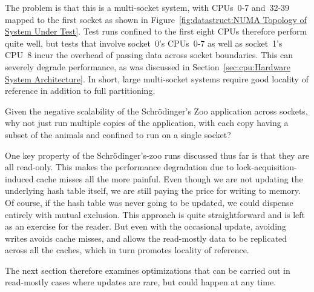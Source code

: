 The problem is that this is a multi-socket system, with CPUs~0-7
and~32-39 mapped to the first socket as shown in
Figure~\ref{fig:datastruct:NUMA Topology of System Under Test}.
Test runs confined to the first eight CPUs therefore perform quite
well, but tests that involve socket~0's CPUs~0-7 as well as
socket~1's CPU~8 incur the overhead of passing data across
socket boundaries.
This can severely degrade performance, as was discussed in
Section~\ref{sec:cpu:Hardware System Architecture}.
In short, large multi-socket systems require good locality of reference
in addition to full partitioning.

\QuickQuiz{}
	Given the negative scalability of the Schr\"odinger's
	Zoo application across sockets, why not just run multiple
	copies of the application, with each copy having a subset
	of the animals and confined to run on a single socket?
 \QuickQuizEnd

One key property of the Schr\"odinger's-zoo runs discussed thus far is that
they are all read-only.
This makes the performance degradation due to lock-acquisition-induced
cache misses all the more painful.
Even though we are not updating the underlying hash table itself, we are
still paying the price for writing to memory.
Of course, if the hash table was never going to be updated, we could dispense
entirely with mutual exclusion.
This approach is quite straightforward and is left as an exercise for the
reader.
But even with the occasional update, avoiding writes avoids cache
misses, and allows the read-mostly data to be replicated across all
the caches, which in turn promotes locality of reference.

The next section therefore examines optimizations that can be carried out in
read-mostly cases where updates are rare, but could happen at any time.

\setlength\dashlinedash{1pt}
\setlength\dashlinegap{2pt}

